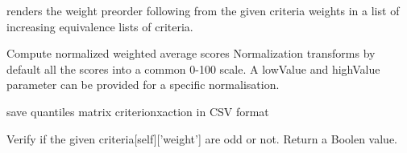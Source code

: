 \documentclass[letterpaper,10pt,english]{sphinxmanual}
\begin{document}
\begin{fulllineitems}
\begin{fulllineitems}
\end{fulllineitems}


\begin{fulllineitems}
\label{techDoc:perfTabs.PerformanceTableau.computeWeightPreorder}
renders the weight preorder following from the given
criteria weights in a list of increasing equivalence
lists of criteria.

\end{fulllineitems}


\begin{fulllineitems}
\label{techDoc:perfTabs.PerformanceTableau.computeWeightedAveragePerformances}
Compute normalized weighted average scores
Normalization transforms by default all the scores into a
common 0-100 scale. A lowValue and highValue parameter
can be provided for a specific normalisation.

\end{fulllineitems}


\begin{fulllineitems}
\label{techDoc:perfTabs.PerformanceTableau.csvAllQuantiles}
save quantiles matrix criterionxaction in CSV format

\end{fulllineitems}


\begin{fulllineitems}
\label{techDoc:perfTabs.PerformanceTableau.hasOddWeightAlgebra}
Verify if the given criteria{[}self{]}{[}'weight'{]} are odd or not.
Return a Boolen value.

\end{fulllineitems}



\end{fulllineitems}
\end{document}
